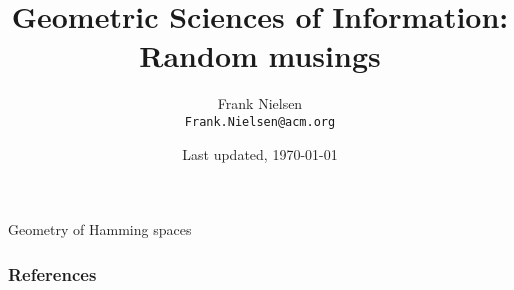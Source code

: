 \documentclass{beamer}
\begin{document}
\title{Geometric Sciences of Information:\\ Random musings}
 
\date{Last updated, \today}

\author{Frank Nielsen\\ {\tt Frank.Nielsen@acm.org}}
 
\begin{frame}
\titlepage
\end{frame}


\begin{frame}{Geometry of Hamming spaces}
\end{frame}


\begin{frame}[allowframebreaks]
        \frametitle{References}
				\tiny


\end{frame}
\end{document}
